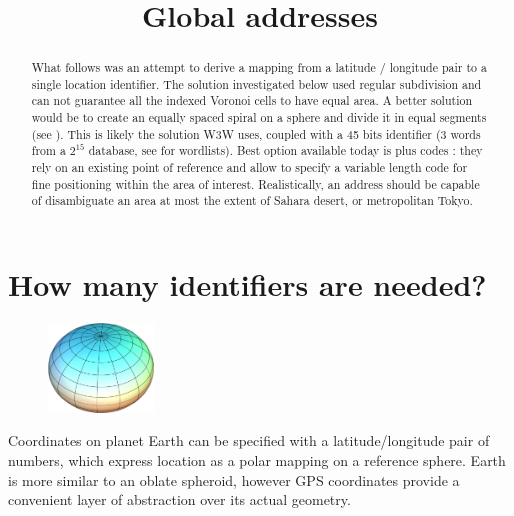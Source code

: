 \documentclass{article}
\title{Global addresses}
\author{}
\begin{document}
\maketitle
\begin{abstract}
What follows was an attempt to derive a mapping from a latitude / longitude pair to a single location identifier. The solution investigated below used regular subdivision and can not guarantee all the indexed Voronoi cells to have equal area. A better solution would be to create an equally spaced spiral on a sphere and divide it in equal segments (see \cite{lenofspherespiral, spherespiralmodel, pointsonsphere}). This is likely the solution W3W uses, coupled with a 45 bits identifier (3 words from a $2^{15}$ database, see \cite{effdice,diceware,PGPwordlist} for wordlists). Best option available today is plus codes \cite{plucodes, evaluation, opencodes}: they rely on an existing point of reference and allow to specify a variable length code for fine positioning within the area of interest. Realistically, an address should be capable of disambiguate an area at most the extent of Sahara desert, or metropolitan Tokyo.
\end{abstract}

\section{How many identifiers are needed?} %

\begin{figure}
\begin{center}
\vspace{-3.5em}
\includegraphics[width=0.25\textwidth]{oblateSpheroid.png}
\vspace{-2em}
\end{center}
\end{figure}
%
Coordinates on planet Earth can be specified with a latitude/longitude pair of numbers, which express location as a polar mapping on a reference sphere. Earth is more similar to an oblate spheroid, however GPS coordinates provide a convenient layer of abstraction over its actual geometry.
\end{document}
